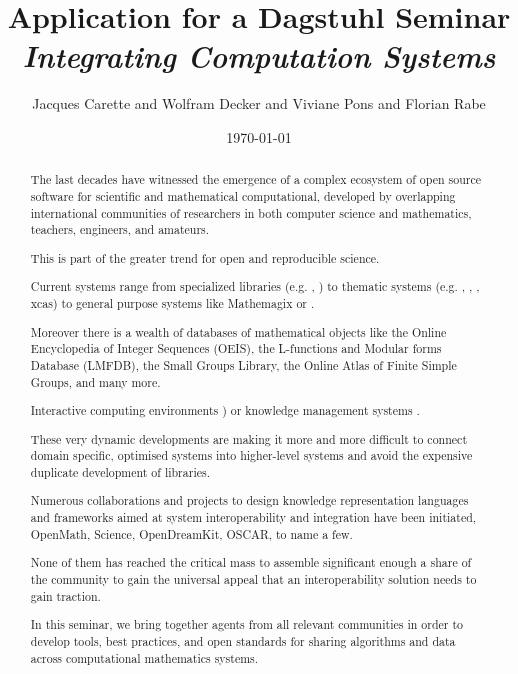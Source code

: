 \documentclass[a4paper,11pt]{article}
\title{Application for a Dagstuhl Seminar \\ \emph{Integrating Computation Systems}}
\author{Jacques Carette and Wolfram Decker and Viviane Pons and Florian Rabe}
\date{\today}
\begin{document}
\maketitle

\begin{abstract}

The last decades have witnessed the emergence of a complex ecosystem of open
source software for scientific and mathematical computational, developed by
overlapping international communities of researchers in both computer science
and mathematics, teachers, engineers, and amateurs.

This is part of the greater trend for open and reproducible science.

Current systems range from specialized libraries (e.g. \MPIR, \Linbox) to
thematic systems (e.g. \GAP, \Pari, \Singular, xcas) to general purpose systems
like Mathemagix or \Sage.

Moreover there is a wealth of databases of mathematical objects like the
Online Encyclopedia of Integer Sequences (OEIS), the L-functions and
Modular forms Database (LMFDB), the Small Groups Library, the Online Atlas of
Finite Simple Groups, and many more. 

Interactive computing environments \Jupyter) or knowledge management systems \MathHub.

These very dynamic developments are making it more and more difficult to connect
domain specific, optimised systems into higher-level systems and
avoid the expensive duplicate development of libraries.

Numerous collaborations and
projects to design knowledge representation languages and frameworks aimed at
system interoperability and integration have been initiated, OpenMath, Science,
OpenDreamKit, OSCAR, to name a few.

None of them has reached the critical mass to assemble
significant enough a share of the community to gain the universal appeal that an
interoperability solution needs to gain traction.

In this seminar, we bring together agents from all relevant communities in order
to develop tools, best practices, and open standards for sharing algorithms and
data across computational mathematics systems.
\end{abstract}
\end{document}
